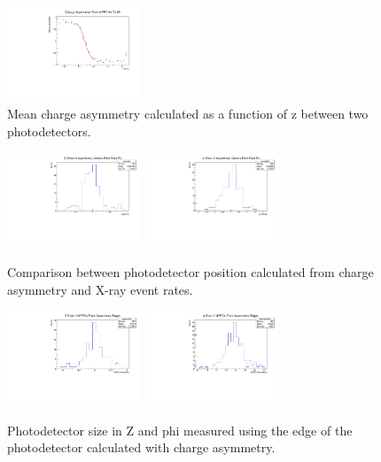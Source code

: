 \begin{figure}
\centering
\includegraphics[width=4cm]{graphics/asym6465.pdf}
\caption{Mean charge asymmetry calculated as a function of z between 
two photodetectors.}
\label{fig:asymplot} 
\end{figure}

\begin{figure}
\centering
\includegraphics[width=4cm]{asymmetryplots/asymdz.pdf}
\includegraphics[width=4cm]{asymmetryplots/asymdphi.pdf}
\caption{Comparison between photodetector position calculated from
charge asymmetry and X-ray event rates.}
\label{fig:asymvsfit} 
\end{figure}



\begin{figure}
\centering
\includegraphics[width=4cm]{asymmetryplots/asymzsize.pdf}
\includegraphics[width=4cm]{asymmetryplots/asymphisize.pdf}
\caption{Photodetector size in Z and phi measured using the edge of the
photodetector calculated with charge asymmetry.}
\label{fig:mppcsize} 
\end{figure}



